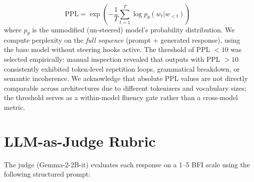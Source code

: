 \documentclass{article}
\begin{document}
\begin{equation}
\text{PPL} = \exp\left(-\frac{1}{T}\sum_{t=1}^{T} \log p_\theta(w_t | w_{<t})\right)
\end{equation}
where $p_\theta$ is the unmodified (un-steered) model's probability distribution. We compute perplexity on the \emph{full sequence} (prompt + generated response), using the base model without steering hooks active. The threshold of PPL $< 10$ was selected empirically: manual inspection revealed that outputs with PPL $> 10$ consistently exhibited token-level repetition loops, grammatical breakdown, or semantic incoherence. We acknowledge that absolute PPL values are not directly comparable across architectures due to different tokenizers and vocabulary sizes; the threshold serves as a within-model fluency gate rather than a cross-model metric.

\section{LLM-as-Judge Rubric}\label{app:judge_rubric}

The judge (Gemma-2-2B-it) evaluates each response on a 1--5 BFI scale using the following structured prompt:

\begin{figure}[H]
\end{figure}
\end{document}
